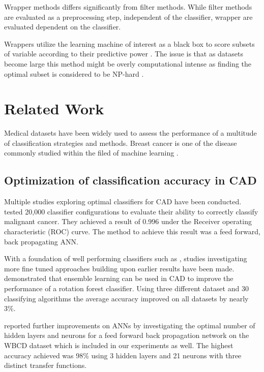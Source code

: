 Wrapper methods differs significantly from filter methods. While filter methods are evaluated as a preprocessing step, independent of the classifier, wrapper are evaluated dependent on the classifier.

Wrappers utilize the learning machine of interest as a black box to score subsets of variable according to their predictive power \parencite{guyon2003}. The issue is that as datasets become large this method might be overly computational intense as finding the optimal subset is considered to be NP-hard \parencite{amaldi1998}.




\section{Related Work}

Medical datasets have been widely used to assess the performance of a multitude of classification strategies and methods. Breast cancer is one of the disease commonly studied within the filed of machine learning \parencite{kononenko2001}.

\subsection{Optimization of classification accuracy in CAD}

Multiple studies exploring optimal classifiers for CAD have been conducted. \textcite{ramos2012} tested 20,000 classifier configurations to evaluate their ability to correctly classify malignant cancer. They achieved a result of 0.996 under the Receiver operating characteristic (ROC) curve. The method to achieve this result was a feed forward, back propagating ANN.

With a foundation of well performing classifiers such as \parencite{ramos2012}, studies investigating more fine tuned approaches building upon earlier results have been made. \textcite{akin2011} demonstrated that ensemble learning can be used in CAD to improve the performance of a rotation forest classifier. Using three different dataset and 30 classifying algorithms the average accuracy improved on all datasets by nearly 3\%.

\textcite{Abdel-Ilah2017} reported further improvements on ANNs by investigating the optimal number of hidden layers and neurons for a feed forward back propagation network on the WBCD dataset which is included in our experiments as well. The highest accuracy achieved was 98\% using 3 hidden layers and 21 neurons with three distinct transfer functions.

